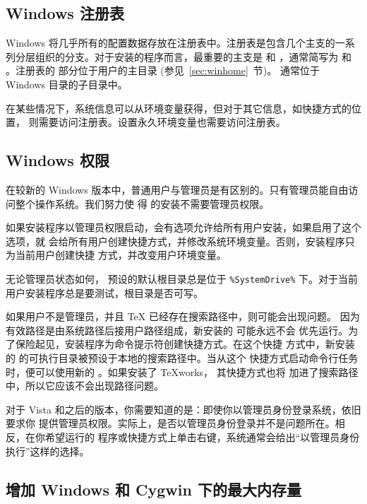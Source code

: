 \documentclass{article}
\begin{document}
\subsection{Windows 注册表}
\label{sec:registry}

Windows 将几乎所有的配置数据存放在注册表中。注册表是包含几个主支的一系
列分层组织的分支。对于安装的程序而言，最重要的主支是 
和 ，通常简写为  和 。注册表的
 部分位于用户的主目录 (参见~\ref{sec:winhome}~节)。
通常位于 Windows 目录的子目录中。

在某些情况下，系统信息可以从环境变量获得，但对于其它信息，如快捷方式的位置，
则需要访问注册表。设置永久环境变量也需要访问注册表。


\subsection{Windows 权限}
\label{sec:winpermissions}

在较新的 Windows 版本中，普通用户与管理员是有区别的。只有管理员能自由访问整个操作系统。我们努力使
得 \TL{} 的安装不需要管理员权限。

如果安装程序以管理员权限启动，会有选项允许给所有用户安装，如果启用了这个选项，就
会给所有用户创建快捷方式，并修改系统环境变量。否则，安装程序只为当前用户创建快捷
方式，并改变用户环境变量。

无论管理员状态如何，\TL{} 预设的默认根目录总是位于 \verb|%SystemDrive%|
下。对于当前用户安装程序总是要测试，根目录是否可写。

如果用户不是管理员，并且 \TeX{} 已经存在搜索路径中，则可能会出现问题。
因为有效路径是由系统路径后接用户路径组成，新安装的 \TL{} 可能永远不会
优先运行。为了保险起见，安装程序为命令提示符创建快捷方式。在这个快捷
方式中，新安装的 \TL{} 的可执行目录被预设于本地的搜索路径中。当从这个
快捷方式启动命令行任务时，便可以使用新的 \TL{}。如果安装了 \TeX{}works，
其快捷方式也将 \TL{} 加进了搜索路径中，所以它应该不会出现路径问题。

对于 Vista 和之后的版本，你需要知道的是：即使你以管理员身份登录系统，依旧要求你
提供管理员权限。实际上，是否以管理员身份登录并不是问题所在。相反，在你希望运行的
程序或快捷方式上单击右键，系统通常会给出“以管理员身份执行”这样的选择。

\subsection{增加 Windows 和 Cygwin 下的最大内存量}
\label{sec:cygwin-maxmem}
\end{document}
